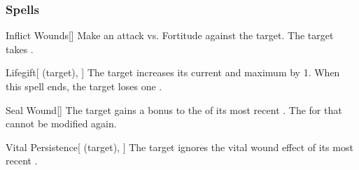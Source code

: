 \subsubsection{Spells}


\lowercase{\hypertarget{spell:Inflict Wounds}{}}\label{spell:Inflict Wounds}
\begin{freeability}[Rank 1]{\hypertarget{spell:Inflict Wounds}{Inflict Wounds}}[]
Make an attack vs. Fortitude against the target.
\hit The target takes .
\end{freeability}
\vspace{0.25em}



\lowercase{\hypertarget{spell:Lifegift}{}}\label{spell:Lifegift}
\begin{attuneability}[Rank 1]{\hypertarget{spell:Lifegift}{Lifegift}}[ (target), ]
The target increases its current and maximum  by 1.
When this spell ends, the target loses one .
\end{attuneability}
\vspace{0.25em}



\lowercase{\hypertarget{spell:Seal Wound}{}}\label{spell:Seal Wound}
\begin{freeability}[Rank 1]{\hypertarget{spell:Seal Wound}{Seal Wound}}[]
The target gains a  bonus to the  of its most recent .
The  for that  cannot be modified again.
\end{freeability}
\vspace{0.25em}



\lowercase{\hypertarget{spell:Vital Persistence}{}}\label{spell:Vital Persistence}
\begin{attuneability}[Rank 3]{\hypertarget{spell:Vital Persistence}{Vital Persistence}}[ (target), ]
The target ignores the vital wound effect of its most recent .
\end{attuneability}
\vspace{0.25em}



